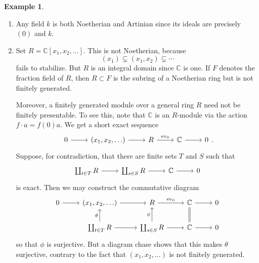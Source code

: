 \documentclass[10pt,letterpaper,cm]{nupset}
\theoremstyle{definition}
\newtheorem{exmp}[definition]{Example}
\theoremstyle{theorem}
\theoremstyle{remark}
\newcommand{\C}{\mathbb C}
\newcommand{\1}{\mathbf{1}}
\newcommand{\0}{\vec 0}
\begin{document}
\begin{exmp} $ $
\begin{enumerate}
\item Any field $k$ is both Noetherian and Artinian since its ideals are precisely $(0)$ and $k$.
\item Set $R= \C[x_1, x_2, \ldots]$. This is not Noetherian, because $$(x_1) \subsetneq (x_1, x_2) \subsetneq \cdots   $$ fails to stabilize. But $R$ is an integral domain since $\C$ is one. If $F$ denotes the fraction field of $R$, then $R\subset F$ is the subring of a Noetherian ring but is not finitely generated. 

Moreover, a finitely generated module over a general ring $R$ need not be finitely presentable. To see this, note that $\C$ is an $R$-module via the action $f \cdot a = f(0)a$. We get a short exact sequence
\[
\begin{tikzcd}
0 \arrow[r] & {(x_1, x_2, \ldots)} \arrow[r] & R \arrow[r, "\text{ev}_0"] & \C \arrow[r] & 0
\end{tikzcd}
.\]
Suppose, for contradiction, that there are finite sets $T$ and $S$ such that 
\[ 
\begin{tikzcd}
 \coprod_{t\in T}R \arrow[r] & \coprod_{s\in S} R \arrow[r] & \C \arrow[r]  & 0
\end{tikzcd} 
\]  is  exact. 
Then we may construct the commutative diagram
\[
\begin{tikzcd}
0 \arrow[r] & {(x_1, x_2, \ldots)} \arrow[r] & R \arrow[r, "\text{ev}_0"] & \C \arrow[r] & 0 \\
 & \coprod_{t\in T}R \arrow[r] \arrow[u, "\theta"] & \coprod_{s\in S} R \arrow[r] \arrow[u, "\phi"] & \C \arrow[r] \arrow[u, equal] & 0
\end{tikzcd}
\] so that $\phi$ is surjective. But a diagram chase shows that this makes $\theta$ surjective, contrary to the fact that $(x_1, x_2, \ldots)$ is not finitely generated.
\end{enumerate}
\end{exmp}
\end{document}
